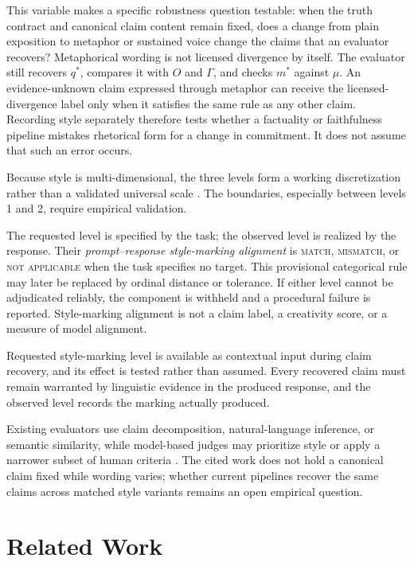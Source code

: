 \documentclass{clv2025}
\begin{document}
This variable makes a specific robustness question testable: when the truth
contract and canonical claim content remain fixed, does a change from plain
exposition to metaphor or sustained voice change the claims that an evaluator
recovers? Metaphorical wording is not licensed divergence by itself. The
evaluator still recovers $q^*$, compares it with $O$ and $\Gamma$, and checks
$m^*$ against $\mu$. An evidence-unknown claim expressed through metaphor can
receive the licensed-divergence label only when it satisfies the same rule as
any other claim. Recording style separately therefore tests whether a
factuality or faithfulness pipeline mistakes rhetorical form for a change in
commitment. It does not assume that such an error occurs.

Because style is multi-dimensional, the three levels form a working
discretization rather than a validated universal scale
\citep{kang_style_2021,jin_deep_2022}.
The boundaries, especially between levels 1 and 2, require empirical
validation.

The requested level is specified by the task; the observed level is realized
by the response. Their \emph{prompt--response style-marking alignment} is
\textsc{match}, \textsc{mismatch}, or \textsc{not applicable} when the task
specifies no target. This provisional categorical rule may later be replaced
by ordinal distance or tolerance. If either level cannot be adjudicated
reliably, the component is withheld and a procedural failure is reported.
Style-marking alignment is not a claim label, a creativity score, or a measure
of model alignment.

Requested style-marking level is available as contextual input during claim
recovery, and its effect is tested rather than assumed.
Every recovered claim must remain warranted by linguistic evidence in the
produced response, and the observed level records the marking actually
produced.

Existing evaluators use claim decomposition, natural-language inference, or
semantic similarity, while model-based judges may prioritize style or apply a
narrower subset of human criteria
\citep{min_factscore_2023,chen_menli_2023,aynetdinov_semscore_2024,feuer_style_2025,lyu_converge_2026}.
The cited work does not hold a canonical claim fixed while wording varies;
whether current pipelines recover the same claims across matched style variants
remains an open empirical question.

\section{Related Work}\label{sec:related}
\end{document}
